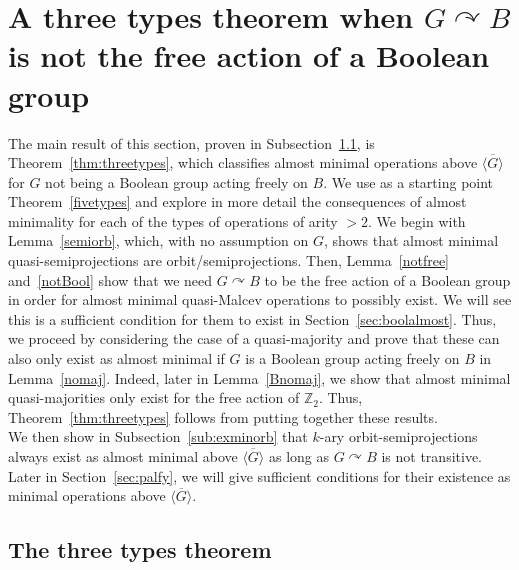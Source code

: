 \documentclass{article}
\theoremstyle{remark}
\theoremstyle{definition}
\def\acts{\curvearrowright}
\begin{document}
\section{A three types theorem when \texorpdfstring{$G\acts B$}{G} is not the free action of a Boolean group}\label{sec:threetypes}
The main result of this section, proven in Subsection~\ref{sub:three}, is Theorem~\ref{thm:threetypes}, which classifies almost minimal operations above $\overline{\langle G\rangle}$ for $G$ not being a Boolean group acting freely on $B$. We use as a starting point Theorem~\ref{fivetypes} and explore in more detail the consequences of almost minimality for each of the types of operations of arity $>2$. We begin with Lemma~\ref{semiorb}, which, with no assumption on $G$, shows that almost minimal quasi-semiprojections  are orbit\-/semiprojections. Then, Lemma~\ref{notfree} and~\ref{notBool} show that we need $G\acts B$ to be the free action of a Boolean group in order for almost minimal quasi-Malcev operations to possibly exist. We will see this is a sufficient condition for them to exist in Section~\ref{sec:boolalmost}. Thus, we proceed by considering the case of a quasi-majority and prove that these can also only exist as almost minimal if $G$ is a Boolean group acting freely on $B$ in Lemma~\ref{nomaj}.  Indeed, later in Lemma~\ref{Bnomaj}, we show that almost minimal quasi-majorities only exist for the free action of $\mathbb{Z}_2$. Thus, Theorem~\ref{thm:threetypes} follows from putting together these results.\\

We then show in Subsection~\ref{sub:exminorb}  that $k$-ary orbit-semiprojections always exist as almost minimal above $\overline{\langle G\rangle}$ as long as $G\acts B$ is not transitive. Later in Section~\ref{sec:palfy}, we will give sufficient conditions for their existence as minimal operations above $\overline{\langle G\rangle}$.


\subsection{The three types theorem}\label{sub:three}
\end{document}
